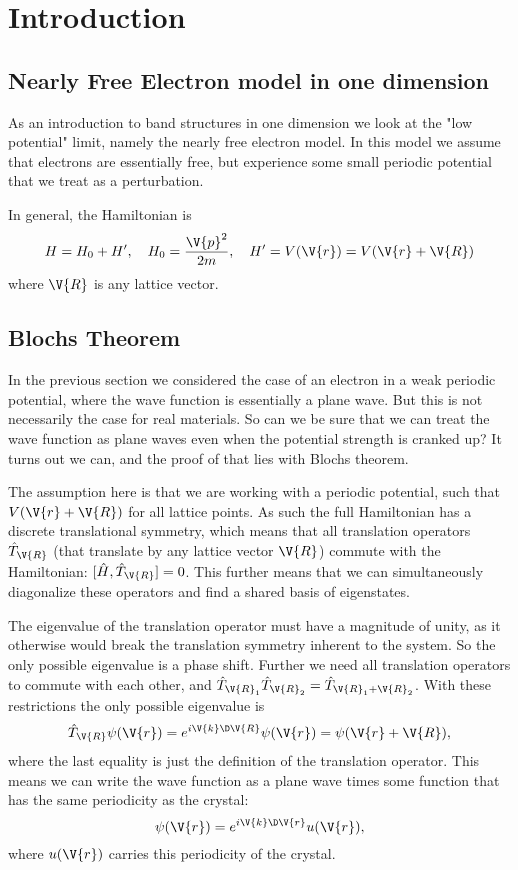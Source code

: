 \documentclass[main.tex]{subfiles}
\begin{document}
	\section{Introduction}
	
	
	\subsection{Nearly Free Electron model in one dimension}
	As an introduction to band structures in one dimension we look at the "low potential" limit, namely the nearly free electron model. In this model we assume that electrons are essentially free, but experience some small periodic potential that we treat as a perturbation.
	
	In general, the Hamiltonian is
	\begin{equation}\label{key}
		H = H_0 + H', \quad H_0 = \frac{\V{p}^2}{2m}, \quad H' = V(\V{r}) = V(\V{r} + \V{R})
	\end{equation}
	where $ \V{R} $ is any lattice vector.
	
	
	
	\subsection{Blochs Theorem}
	In the previous section we considered the case of an electron in a weak periodic potential, where the wave function is essentially a plane wave. But this is not necessarily the case for real materials. So can we be sure that we can treat the wave function as plane waves even when the potential strength is cranked up? It turns out we can, and the proof of that lies with Blochs theorem.
	
	The assumption here is that we are working with a periodic potential, such that $ V(\V{r} + \V{R}) $ for all lattice points. As such the full Hamiltonian has a discrete translational symmetry, which means that all translation operators $ \hat{T}_{\V{R}} $ (that translate by any lattice vector $ \V{R} $) commute with the Hamiltonian: $ [\hat{H}, \hat{T}_{\V{R}}] = 0$. This further means that we can simultaneously diagonalize these operators and find a shared basis of eigenstates.
	
	The eigenvalue of the translation operator must have a magnitude of unity, as it otherwise would break the translation symmetry inherent to the system. So the only possible eigenvalue is a phase shift. Further we need all translation operators to commute with each other, and $ \hat{T}_{\V{R}_1} \hat{T}_{\V{R}_2} = \hat{T}_{\V{R}_1 + \V{R}_2} $. With these restrictions the only possible eigenvalue is
	\begin{equation}\label{key}
		\hat{T}_{\V{R}} \psi(\V{r}) = e^{i\V{k} \D\V{R}} \psi(\V{r}) = \psi(\V{r}+\V{R}),
	\end{equation}
	where the last equality is just the definition of the translation operator. This means we can write the wave function as a plane wave times some function that has the same periodicity as the crystal:
	\begin{equation}\label{key}
		\psi(\V{r}) = e^{i\V{k} \D \V{r}} u(\V{r}),
	\end{equation}
	where $ u(\V{r}) $ carries this periodicity of the crystal.
	
	
	
\end{document}
